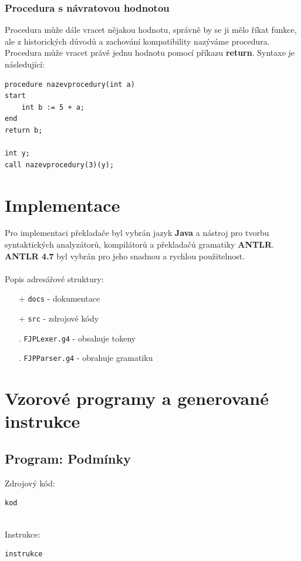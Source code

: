 \documentclass[12pt]{report}
\begin{document}
\subsection{Procedura s návratovou hodnotou}
Procedura může dále vracet nějakou hodnotu, správně by se ji mělo říkat funkce, ale z historických důvodů a zachování kompatibility nazýváme procedura.  Procedura může vracet právě jednu hodnotu pomocí příkazu \textbf{return}. Syntaxe je následující:
\begin{verbatim}
procedure nazevprocedury(int a)
start
    int b := 5 + a;
end
return b;

int y;
call nazevprocedury(3)(y);
\end{verbatim}




\chapter{Implementace}
Pro implementaci překladače byl vybrán jazyk \textbf{Java} a nástroj pro tvorbu syntaktických analyzátorů, kompilátorů a překladačů gramatiky \textbf{ANTLR}. \textbf{ANTLR 4.7} byl vybrán pro jeho snadnou a rychlou použitelnost.
\\\\
Popis adresářové struktury:
\begin{itemize}[noitemsep]
\item [+] \texttt{docs} - dokumentace
\item [+] \texttt{src} - zdrojové kódy
\item [.] \texttt{FJPLexer.g4} - obsahuje tokeny
\item [.] \texttt{FJPParser.g4} - obrahuje gramatiku
\end{itemize}


\chapter{Vzorové programy a generované instrukce}

\section{Program: Podmínky}
Zdrojový kód:
\begin{verbatim}
kod
\end{verbatim}
\ \\
Instrukce:
\begin{verbatim}
instrukce
\end{verbatim}
\end{document}
